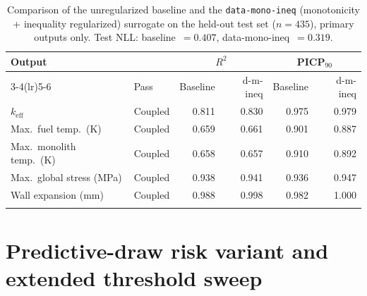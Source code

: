 \documentclass[pdflatex,sn-mathphys-num]{sn-jnl}
\theoremstyle{thmstyleone}
\theoremstyle{thmstyletwo}
\theoremstyle{thmstylethree}
\begin{document}
\begin{appendices}
\begin{table}[ht]
\caption{%
  Comparison of the unregularized baseline and the \texttt{data-mono-ineq}
  (monotonicity + inequality regularized) surrogate on the held-out test set
  ($n = 435$), primary outputs only.
  Test NLL: baseline~$= 0.407$, data-mono-ineq~$= 0.319$.
}\label{tab:baseline_compare}
\begin{tabular*}{\textwidth}{@{\extracolsep\fill}llrrrr@{}}
\toprule
Output & & \multicolumn{2}{c}{$R^2$} & \multicolumn{2}{c}{PICP$_{90}$} \\
\cmidrule(lr){3-4}\cmidrule(lr){5-6}
       & Pass & Baseline & d-m-ineq & Baseline & d-m-ineq \\
\midrule
$k_{\mathrm{eff}}$               & Coupled & 0.811 & 0.830 & 0.975 & 0.979 \\
Max.\ fuel temp.\ (K)            & Coupled & 0.659 & 0.661 & 0.901 & 0.887 \\
Max.\ monolith temp.\ (K)        & Coupled & 0.658 & 0.657 & 0.910 & 0.892 \\
Max.\ global stress (MPa)        & Coupled & 0.938 & 0.941 & 0.936 & 0.947 \\
Wall expansion (mm)              & Coupled & 0.988 & 0.998 & 0.982 & 1.000 \\
\botrule
\end{tabular*}
\end{table}

\section{Predictive-draw risk variant and extended threshold sweep}\label{app:predictive_risk}


\end{appendices}
\end{document}
